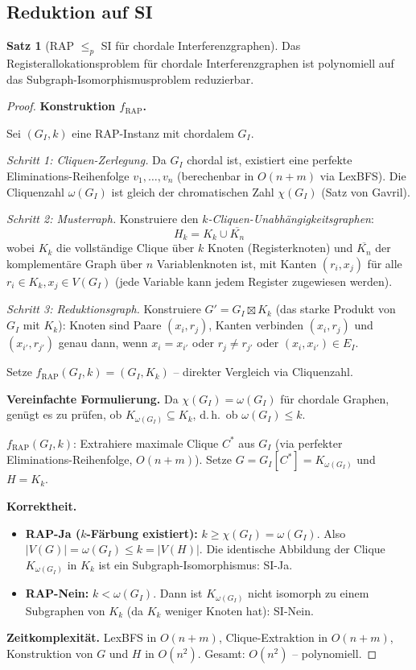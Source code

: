 ﻿\documentclass[a4paper,12pt]{article}
\theoremstyle{definition}
\newtheorem{satz}{Satz}
\begin{document}
\subsection{Reduktion auf SI}

\begin{satz}[RAP $\leq_p$ SI für chordale Interferenzgraphen]
\label{satz:rap-si}
Das Registerallokationsproblem für chordale Interferenzgraphen ist polynomiell auf das Subgraph-Isomorphismusproblem reduzierbar.
\end{satz}

\begin{proof}
\textbf{Konstruktion $f_{\text{RAP}}$.}

Sei $(G_I, k)$ eine RAP-Instanz mit chordalem $G_I$.

\textit{Schritt 1: Cliquen-Zerlegung.}
Da $G_I$ chordal ist, existiert eine perfekte Eliminations-Reihenfolge $v_1, \ldots, v_n$ (berechenbar in $O(n + m)$ via LexBFS). Die Cliquenzahl $\omega(G_I)$ ist gleich der chromatischen Zahl $\chi(G_I)$ (Satz von Gavril).

\textit{Schritt 2: Musterraph.}
Konstruiere den \emph{$k$-Cliquen-Unabhängigkeitsgraphen}:
\[
H_k = K_k \cup \overline{K_n}
\]
wobei $K_k$ die vollständige Clique über $k$ Knoten (Registerknoten) und $\overline{K_n}$ der komplementäre Graph über $n$ Variablenknoten ist, mit Kanten $(r_i, x_j)$ für alle $r_i \in K_k, x_j \in V(G_I)$ (jede Variable kann jedem Register zugewiesen werden).

\textit{Schritt 3: Reduktionsgraph.}
Konstruiere $G' = G_I \boxtimes K_k$ (das starke Produkt von $G_I$ mit $K_k$): Knoten sind Paare $(x_i, r_j)$, Kanten verbinden $(x_i, r_j)$ und $(x_{i'}, r_{j'})$ genau dann, wenn $x_i = x_{i'}$ oder $r_j \neq r_{j'}$ oder $(x_i, x_{i'}) \in E_I$.

Setze $f_{\text{RAP}}(G_I, k) = (G_I, K_k)$ -- direkter Vergleich via Cliquenzahl.

\textbf{Vereinfachte Formulierung.}
Da $\chi(G_I) = \omega(G_I)$ für chordale Graphen, genügt es zu prüfen, ob $K_{\omega(G_I)} \subseteq K_k$, d.\,h.\ ob $\omega(G_I) \leq k$.

$f_{\text{RAP}}(G_I, k)$: Extrahiere maximale Clique $C^*$ aus $G_I$ (via perfekter Eliminations-Reihenfolge, $O(n + m)$). Setze $G = G_I[C^*] = K_{\omega(G_I)}$ und $H = K_k$.

\textbf{Korrektheit.}
\begin{itemize}
    \item \textbf{RAP-Ja ($k$-Färbung existiert):} $k \geq \chi(G_I) = \omega(G_I)$. Also $|V(G)| = \omega(G_I) \leq k = |V(H)|$. Die identische Abbildung der Clique $K_{\omega(G_I)}$ in $K_k$ ist ein Subgraph-Isomorphismus: SI-Ja.
    \item \textbf{RAP-Nein:} $k < \omega(G_I)$. Dann ist $K_{\omega(G_I)}$ nicht isomorph zu einem Subgraphen von $K_k$ (da $K_k$ weniger Knoten hat): SI-Nein.
\end{itemize}

\textbf{Zeitkomplexität.}
LexBFS in $O(n + m)$, Clique-Extraktion in $O(n + m)$, Konstruktion von $G$ und $H$ in $O(n^2)$. Gesamt: $O(n^2)$ -- polynomiell.
\end{proof}
\end{document}
